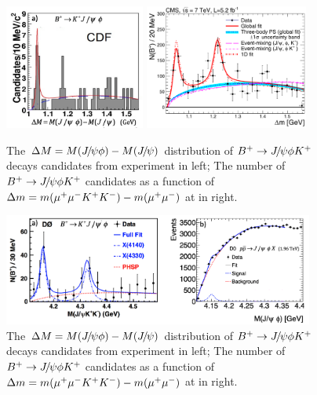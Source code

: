 \begin{figure}[htb]
  \begin{center}
  \vspace{-0.3cm}
   \includegraphics[width=0.41\textwidth]{Figures/01_Introduction/Exotic/neutral_particle/CDF_4140}
   \includegraphics[width=0.48\textwidth]{Figures/01_Introduction/Physics/from_Zcs/newFig3.pdf}
     \vskip -0.4cm
    \caption{\small
     The $\Delta M = M({{J\mskip -3mu/\mskip -2mu\psi}}\phi)-M({{J\mskip -3mu/\mskip -2mu\psi}})$ distribution of ${{{B}^+}}\rightarrow{\ensuremath{{J\mskip -3mu/\mskip -2mu\psi}}}\phi{\ensuremath{{K}^+}}$ decays candidates from \cdf experiment in left\supercite{Aaltonen:2011at}; 
     The number of  ${{{B}^+}}\rightarrow{\ensuremath{{J\mskip -3mu/\mskip -2mu\psi}}}\phi K^+$  candidates as a function 
     of $\Delta m = m(\mu^+\mu^-{{K}^+}{{K}^-})-m(\mu^+\mu^-)$ at \cms in right\supercite{Abazov:2015sxa}.
    }
    \label{newfig3}
  \end{center}
\end{figure}

\begin{figure}[htb]
  \begin{center}
  \vspace{-0.3cm}
   \includegraphics[width=0.91\textwidth]{Figures/01_Introduction/Exotic/neutral_particle/D0_4140}
     \vskip -0.4cm
    \caption{\small
     The $\Delta M = M({{J\mskip -3mu/\mskip -2mu\psi}}\phi)-M({{J\mskip -3mu/\mskip -2mu\psi}})$ distribution of ${{{B}^+}}\rightarrow{\ensuremath{{J\mskip -3mu/\mskip -2mu\psi}}}\phi{\ensuremath{{K}^+}}$ decays candidates from \cdf experiment in left\supercite{Aaltonen:2011at}; 
     The number of  ${{{B}^+}}\rightarrow{\ensuremath{{J\mskip -3mu/\mskip -2mu\psi}}}\phi K^+$  candidates as a function 
     of $\Delta m = m(\mu^+\mu^-{{K}^+}{{K}^-})-m(\mu^+\mu^-)$ at \cms in right\supercite{Abazov:2015sxa}.
    }
    \label{fig:D0_4140}
  \end{center}
\end{figure}

